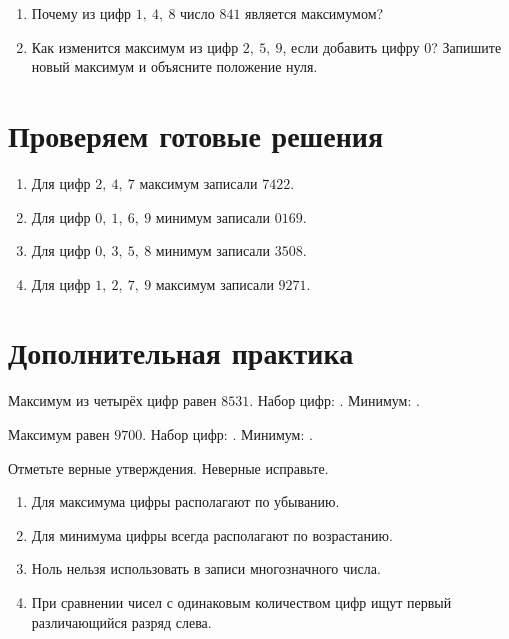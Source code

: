 \newpage
\begin{practicebox}
  \begin{enumerate}[label=\textbf{\arabic*.}]
    \item Почему из цифр \(1,\ 4,\ 8\) число \(841\) является максимумом?
    \item Как изменится максимум из цифр \(2,\ 5,\ 9\), если добавить цифру
      0? Запишите новый максимум и объясните положение нуля.
  \end{enumerate}
\end{practicebox}

\section{Проверяем готовые решения}

\begin{warningbox}
  \begin{enumerate}[label=\textbf{\arabic*.}]
    \item Для цифр \(2,\ 4,\ 7\) максимум записали \(7422\).
    \item Для цифр \(0,\ 1,\ 6,\ 9\) минимум записали \(0169\).
    \item Для цифр \(0,\ 3,\ 5,\ 8\) минимум записали \(3508\).
    \item Для цифр \(1,\ 2,\ 7,\ 9\) максимум записали \(9271\).
  \end{enumerate}
\end{warningbox}

\section{Дополнительная практика}

\begin{fillbox}
  Максимум из четырёх цифр равен \(8531\). Набор цифр:
  \answerblank[52mm]. Минимум: \answerblank[38mm].

  Максимум равен \(9700\). Набор цифр: \answerblank[52mm]. Минимум:
  \answerblank[38mm].
\end{fillbox}

\begin{practicebox}
  Отметьте верные утверждения. Неверные исправьте.
  \begin{enumerate}[label=\choicebox]
    \item Для максимума цифры располагают по убыванию.
    \item Для минимума цифры всегда располагают по возрастанию.
    \item Ноль нельзя использовать в записи многозначного числа.
    \item При сравнении чисел с одинаковым количеством цифр ищут первый
      различающийся разряд слева.
  \end{enumerate}

\end{practicebox}

